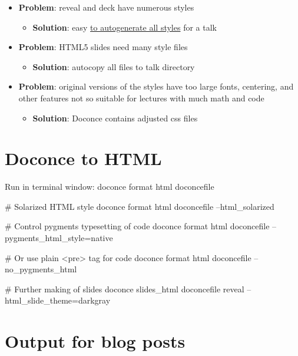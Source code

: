 \documentclass[%
twoside,                 %
draft,                   %
final,                   %
chapterprefix=true,      %
open=right               %
10pt]{book}
\newcounter{doconce:movie:counter}
\newcounter{doconce:exercise:counter}
\begin{document}
\begin{shadedquoteBlue}
\begin{itemize}
\noindent
 \item \textbf{Problem}: reveal and deck have numerous styles
\begin{itemize}

   \item \textbf{Solution}: easy \href{{http://hplgit.github.com/teamods/doconce/demo/index.html}}{to autogenerate all styles} for a talk

\end{itemize}

\noindent
 \item \textbf{Problem}: HTML5 slides need many style files
\begin{itemize}

   \item \textbf{Solution}: autocopy all files to talk directory

\end{itemize}

\noindent
 \item \textbf{Problem}: original versions of the styles have too large fonts,
   centering, and other features not so suitable for lectures
   with much math and code
\begin{itemize}

   \item \textbf{Solution}: Doconce contains adjusted css files
\end{itemize}

\noindent
\end{itemize}

\noindent


\section*{Doconce to HTML}

Run in terminal window:
\bccq
doconce format html doconcefile

# Solarized HTML style
doconce format html doconcefile --html_solarized

# Control pygments typesetting of code
doconce format html doconcefile --pygments_html_style=native

# Or use plain <pre> tag for code
doconce format html doconcefile --no_pygments_html

# Further making of slides
doconce slides_html doconcefile reveal --html_slide_theme=darkgray
\eccq

\section*{Output for blog posts}


\end{shadedquoteBlue}
\end{document}
